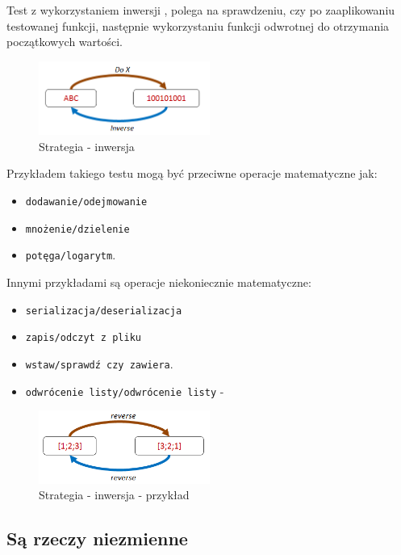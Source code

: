 Test z wykorzystaniem inwersji , polega na sprawdzeniu, czy po zaaplikowaniu testowanej funkcji, następnie wykorzystaniu funkcji odwrotnej do otrzymania początkowych wartości.   
\begin{figure}
    \centering
    \includegraphics[width=0.5\textwidth]{images/property_inverse.png}
    \caption{Strategia - inwersja}
    \label{fig:inverse_strategy}
\end{figure}
Przykładem takiego testu mogą być przeciwne operacje matematyczne jak:
\begin{itemize}
    \item \texttt{dodawanie/odejmowanie}
    \item \texttt{mnożenie/dzielenie}
    \item \texttt{potęga/logarytm}.
\end{itemize} 
Innymi przykładami są operacje niekoniecznie matematyczne:
\begin{itemize}
    \item \texttt{serializacja/deserializacja}
    \item \texttt{zapis/odczyt z pliku}
    \item \texttt{wstaw/sprawdź czy zawiera}.
    \item \texttt{odwrócenie listy/odwrócenie listy} - 
\end{itemize}

\begin{figure}
    \centering
    \includegraphics[width=0.5\textwidth]{images/property_list_rev_inverse.png}
    \caption{Strategia - inwersja - przykład}
    \label{fig:inverse_strategy_list_inversion}
\end{figure}

\subsection{Są rzeczy niezmienne}

